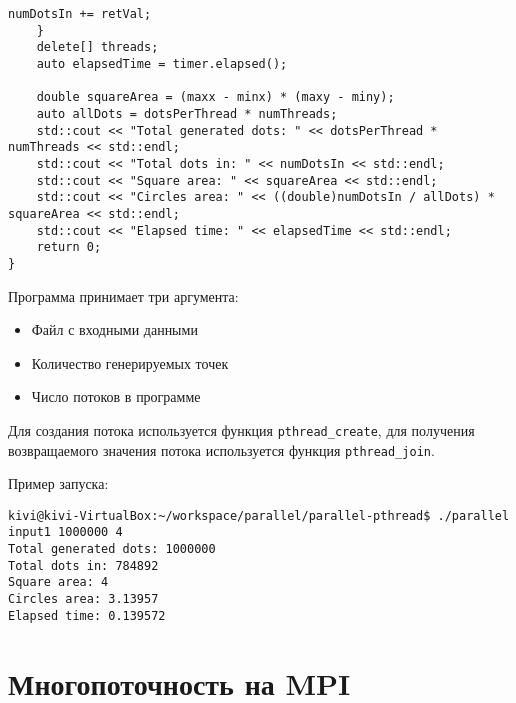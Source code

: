 \begin{lstlisting}[caption={Многопоточность на Pthreads}, label={lst:pthreads}, style=crs_cpp]
        numDotsIn += retVal;
    }
    delete[] threads;
    auto elapsedTime = timer.elapsed();

    double squareArea = (maxx - minx) * (maxy - miny);
    auto allDots = dotsPerThread * numThreads;
    std::cout << "Total generated dots: " << dotsPerThread * numThreads << std::endl;
    std::cout << "Total dots in: " << numDotsIn << std::endl;
    std::cout << "Square area: " << squareArea << std::endl;
    std::cout << "Circles area: " << ((double)numDotsIn / allDots) * squareArea << std::endl;
    std::cout << "Elapsed time: " << elapsedTime << std::endl;
    return 0;
}
\end{lstlisting}

Программа принимает три аргумента:
\begin{itemize}
\item Файл с входными данными
\item Количество генерируемых точек
\item Число потоков в программе
\end{itemize}

Для создания потока используется функция \texttt{pthread\_create}, для получения возвращаемого значения потока используется функция \texttt{pthread\_join}.

Пример запуска:
\begin{lstlisting}[style=crs_bash]
kivi@kivi-VirtualBox:~/workspace/parallel/parallel-pthread$ ./parallel input1 1000000 4
Total generated dots: 1000000
Total dots in: 784892
Square area: 4
Circles area: 3.13957
Elapsed time: 0.139572
\end{lstlisting}

\section{Многопоточность на MPI}


